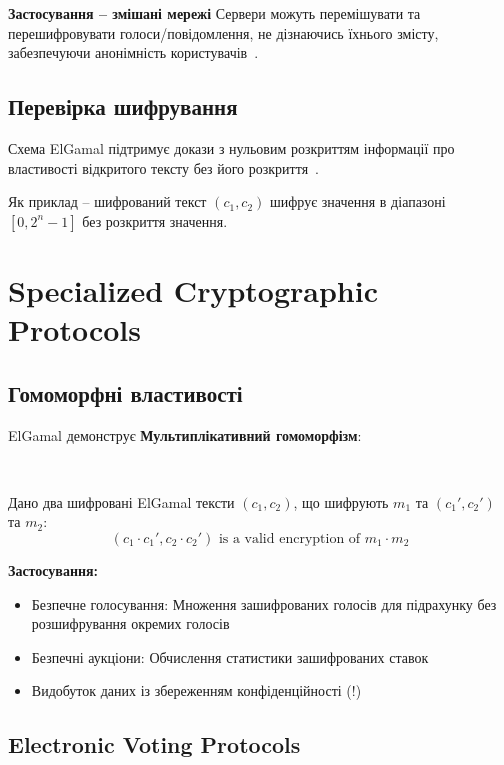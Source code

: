 \textbf{Застосування -- змішані мережі} Сервери можуть перемішувати та перешифровувати голоси/повідомлення, не 
дізнаючись їхнього змісту, забезпечуючи анонімність користувачів~\cite{chaum1981untraceable}.

\subsection{Перевірка шифрування}

Схема ElGamal підтримує докази з нульовим розкриттям інформації про властивості відкритого тексту без його 
розкриття~\cite{camenisch2003practical}.

Як приклад -- шифрований текст $(c_1, c_2)$ шифрує значення в діапазоні $[0, 2^n-1]$ без розкриття значення.

\section{Specialized Cryptographic Protocols}

\subsection{Гомоморфні властивості}

ElGamal демонструє \textbf{Мультиплікативний гомоморфізм}:

\begin{theorem}
    ~\par Дано два шифровані ElGamal тексти $(c_1, c_2)$, що шифрують $m_1$ та $(c_1', c_2')$ та $m_2$:
    \begin{equation*}
        (c_1 \cdot c_1', c_2 \cdot c_2') \text{ is a valid encryption of } m_1 \cdot m_2
    \end{equation*}
\end{theorem}

\textbf{Застосування:}
\begin{itemize}
    \item Безпечне голосування: Множення зашифрованих голосів для підрахунку без розшифрування окремих голосів
    \item Безпечні аукціони: Обчислення статистики зашифрованих ставок
    \item Видобуток даних із збереженням конфіденційності (!)
\end{itemize}

\subsection{Electronic Voting Protocols}

